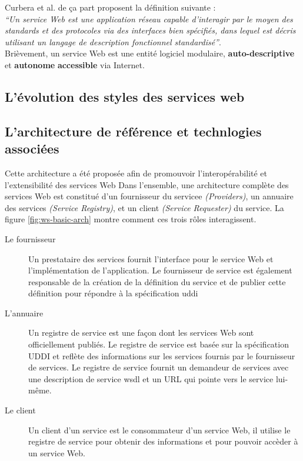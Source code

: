 
  Curbera et al. \cite{curbera2001web} de ça part proposent la
  définition suivante :\\
  \emph{``Un service Web est une application réseau capable
    d'interagir par le moyen des standards et des protocoles via des
    interfaces bien spécifiés, dans lequel est décris utilisant un
    langage de description fonctionnel standardisé''}.\\

  Brièvement, un service Web est une entité logiciel modulaire,
  \textbf{auto-descriptive} et \textbf{autonome} \textbf{accessible}
  via Internet.

  \subsection{L'évolution des styles des services web}
  \label{sec:levol-des-styl}
  

  \newpage
  \subsection{L'architecture de référence et technlogies associées}
  \label{sec:reference-arch}
  Cette architecture a été proposée afin de promouvoir
  l'interopérabilité et l'extensibilité des services Web Dans
  l'ensemble, une architecture complète des services Web est constitué
  d'un fournisseur du servicee \textit{(Providers)}, un annuaire des
  services \textit{(Service Registry)}, et un client \textit{(Service
    Requester)} du service.  La figure \ref{fig:ws-basic-arch} montre
  comment ces trois rôles interagissent.

  

  \SpecialItem
  \begin{description}
    \item[Le fournisseur] Un prestataire des services fournit
      l'interface pour le service Web et l'implémentation de
      l'application. Le fournisseur de service est également responsable
      de la création de la définition du service et de publier cette
      définition pour répondre à la spécification \acrshort{uddi}
  
    \item[L'annuaire] Un registre de service est une façon dont les
      services Web sont officiellement publiés. Le registre de service
      est basée sur la spécification \textsc{UDDI} et reflète des
      informations sur les services fournis par le fournisseur de
      services. Le registre de service fournit un demandeur de
      services avec une description de service \acrshort{wsdl} et un
      \textsc{URL} qui pointe vers le service lui-même.
  
    \item[Le client] Un client d'un service est le consommateur d'un
      service Web, il utilise le registre de service pour obtenir des
      informations et pour pouvoir accèder à un service Web.
  \end{description}

